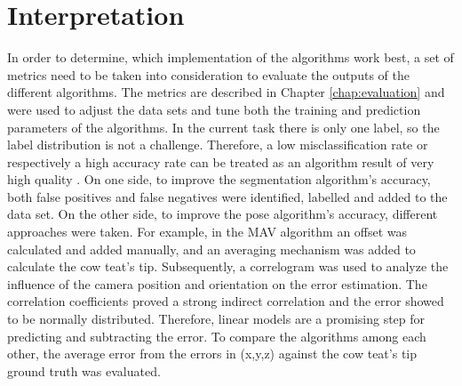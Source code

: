 \section{Interpretation}\label{chap:3:interpretation}
In order to determine, which implementation of the algorithms work best, a set of metrics need to be taken into consideration to evaluate the outputs of the different algorithms. The metrics are described in Chapter \ref{chap:evaluation} and were used to adjust the data sets and tune both the training and prediction parameters of the algorithms. In the current task there is only one label, so the label distribution is not a challenge. Therefore, a low misclassification rate or respectively a high accuracy rate can be treated as an algorithm result of very high quality \cite{luckert2016using}. On one side, to improve the segmentation algorithm's accuracy, both false positives and false negatives were identified, labelled and added to the data set. On the other side, to improve the pose algorithm's accuracy, different approaches were taken. For example, in the MAV algorithm an offset was calculated and added manually, and an averaging mechanism was added to calculate the cow teat's tip. Subsequently, a correlogram was used to analyze the influence of the camera position and orientation on the error estimation. The correlation coefficients proved a strong indirect correlation and the error showed to be normally distributed. Therefore, linear models are a promising step for predicting and subtracting the error. 
To compare the algorithms among each other, the average error from the errors in (x,y,z) against the cow teat's tip ground truth was evaluated. 

